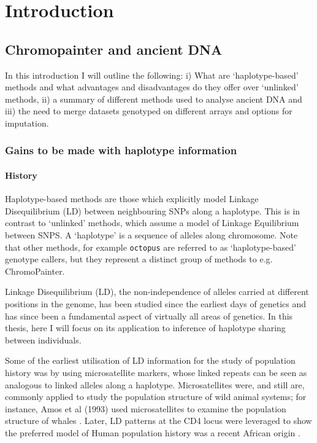 \chapter{Introduction}

\section{Chromopainter and ancient DNA}

In this introduction I will outline the following: i) What are `haplotype-based' methods and what advantages and disadvantages do they offer over `unlinked' methods, ii) a summary of different methods used to analyse ancient DNA and iii) the need to merge datasets genotyped on different arrays and options for imputation. 

\subsection{Gains to be made with haplotype information}

\subsubsection{History}

Haplotype-based methods are those which explicitly model Linkage Disequilibrium (LD) between neighbouring SNPs along a haplotype. This is in contrast to `unlinked' methods, which assume a model of Linkage Equilibrium between SNPS. A `haplotype' is a sequence of alleles along chromosome. Note that other methods, for example \texttt{octopus} \cite{octopus} are referred to as `haplotype-based' genotype callers, but they represent a distinct group of methods to e.g. ChromoPainter.  

Linkage Disequilibrium (LD), the non-independence of alleles carried at different positions in the genome, has been studied since the earliest days of genetics \cite{morgan1912complete, bateson1902experiments} and has since been a fundamental aspect of virtually all areas of genetics. In this thesis, here I will focus on its application to inference of haplotype sharing between individuals. 

Some of the earliest utilisation of LD information for the study of population history was by using microsatellite markers, whose linked repeats can be seen as analogous to linked alleles along a haplotype. Microsatellites were, and still are, commonly applied to study the population structure of wild animal systems; for instance, Amos et al (1993) used microsatellites to examine the population structure of whales \cite{amos1993social}. Later, LD  patterns at the CD4 locus were leveraged to show the preferred model of Human population history was a recent African origin \cite{tishkoff1996global}. 



